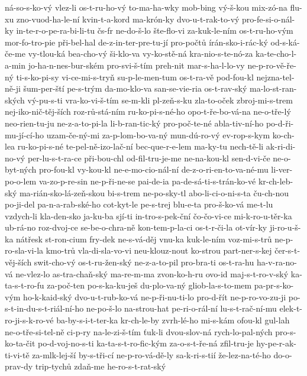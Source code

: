 {ná-so-s-ko-vý
vlez-li
os-t-ru-ho-vý
to-ma-ha-wky
mob-bing
vý-š-kou
mix-zó-na
flu-xu
zno-vuod-ha-le-ní
kvin-t-a-kord
ma-krón-ky
dvo-u-t-rak-to-vý
pro-fe-si-o-nál-ky
in-te-r-o-pe-ra-bi-li-tu
čs-fr
ne-do-š-lo
šte-flo-vi
za-kuk-le-ním
os-t-ru-ho-vým
mor-fo-tro-pie
při-bel-hal
de-z-in-ter-pre-tu-jí
pro-počtů
írán-sko-i-rác-ký
od-s-ká-če-me
vy-tlou-ká
bea-cho-vý
ši-klo-va
vy-ko-stě-ná
kra-nio-s-te-nó-za
ka-te-cho-l-a-min
jo-ha-n-nes-bur-ském
pro-svi-š-tím
preh-nit
mar-s-ha-l-lo-vy
ne-p-ro-vě-ře-ný
ti-s-ko-pi-sy
vi-ce-mi-s-tryň
su-p-le-men-tum
os-t-ra-vě
pod-fou-kl
nejzna-tel-ně-ji
šum-per-ští
pe-s-trým
da-mo-klo-va
san-se-vie-ria
os-t-rav-ský
ma-lo-st-ran-ských
vý-pu-s-ti
vra-ko-vi-š-tím
se-m-kli
pl-zeň-s-ku
zla-to-oček
zbroj-mi-s-trem
nej-iko-nič-těj-ších
roz-rů-stá-ním
ru-ko-pi-s-né-ho
opo-t-ře-bo-vá-na
ne-o-tře-lý
neo-rien-tu-ju
ne-z-a-to-pi-la
li-b-ran-tic-ký
pro-poč-te-né
abla-tiv-ní-ho
po-d-ři-mu-jí-cí-ho
uzam-če-ný-mi
za-p-lom-bo-va-ný
mun-dú-ro-vý
ev-rop-s-kym
ko-ch-lea
ru-ko-pi-s-né
te-pel-ně-izo-lač-ní
bec-que-r-e-lem
ma-ky-tu
nech-tě-li
ak-ri-di-no-vý
per-lu-s-t-ra-ce
při-bou-chl
od-fil-tru-je-me
ne-na-kou-kl
sen-d-vi-če
ne-o-byt-ných
pro-fou-kl
vy-kou-kl
ne-e-mo-cio-nál-ní
de-z-o-ri-en-to-va-né-mu
li-ver-po-o-lem
va-zo-p-re-sin
ne-p-ři-ne-se
pai-de-ia
pa-de-sá-ti-s-trán-ko-vé
kr-ch-leb-ský
ma-rián-sko-lá-zeň-skou
bi-s-trem
ne-po-sky-tl
abo-li-ci-o-ni-s-ta
ču-ch-nou
po-ji-del
pa-n-a-rab-ské-ho
cot-kyt-le
pe-s-trej
blu-e-ta
pro-š-ko-vá
me-t-lu
vzdych-li
kla-den-sko
ja-ku-ba
sjí-ti
in-tro-s-pek-ční
čo-čo-vi-ce
mi-k-ro-u-těr-ka
ub-rá-no
roz-dvoj-ce
se-be-o-chra-ně
kon-tem-p-la-ci
os-t-r-či-la
ot-vír-ky
ji-ro-u-š-ka
nátřesk
st-ron-cium
fry-dek
ne-s-vá-děj
vnu-ka
kuk-le-ním
voz-mi-s-trů
ne-p-ro-sla-vi-la
kmo-trů
vla-di-sla-vo-vi
neu-klouz-nout
ko-strou
part-ner-s-kej
čer-s-t-věj-ších
swit-cho-vý
os-t-ru-žen-ský
ne-z-a-to-pil
pro-bra-ti
os-t-ra-hu
ha-v-ra-no-vá
ne-vlez-lo
as-tra-chaň-ský
ma-re-m-ma
zvon-ko-h-ru
ovo-id
maj-s-t-ro-v-ský
ka-ta-s-t-ro-fu
za-poč-ten
po-s-ka-ku-ješ
du-plo-va-ný
gliob-la-s-to-mem
pa-pr-s-ko-vým
ho-k-kaid-ský
dvo-u-t-rub-ko-vá
ne-p-ři-nu-ti-lo
pro-d-řít
ne-p-ro-vo-zu-ji
po-s-t-in-du-s-t-riál-ní-ho
ne-po-š-lo
na-strou-hat
pe-ri-o-rál-ní
lu-s-t-rač-ní-mu
elek-t-ro-ji-s-k-ro-vé
ba-by-s-i-t-ter-ka
kr-ch-le-by
zvrh-lé-ho
mi-s-kám
ofou-kl
gul-lah
ne-o-tře-si-tel-ně
ci-p-ry
na-le-zi-š-tím
ťuk-li
dvou-slov-ná
rych-lo-pal-ných
pro-s-ko-ta-čit
po-d-voj-no-s-ti
ka-ta-s-t-ro-fic-kým
za-o-s-t-ře-ná
zfil-tru-je
hy-pe-r-ak-ti-vi-tě
za-mlk-lej-ší
by-s-tři-cí
ne-p-ro-vá-dě-ly
sa-k-ri-s-tií
že-lez-na-té-ho
do-o-prav-dy
trip-tychů
zdaň-me
he-ro-s-t-rat-ský
}
